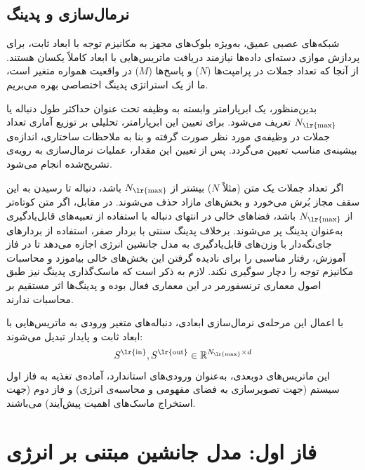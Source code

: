 \subsection{نرمال‌سازی و پدینگ}\label{sec:4-2-3}

شبکه‌های عصبی عمیق، به‌ویژه بلوک‌های مجهز به مکانیزم توجه با ابعاد ثابت، برای پردازش موازی دسته‌ای داده‌ها نیازمند دریافت ماتریس‌هایی با ابعاد کاملاً یکسان هستند. از آنجا که تعداد جملات در پرامپت‌ها ($N$) و پاسخ‌ها ($M$) در واقعیت همواره متغیر است، ما از یک استراتژی پدینگ اختصاصی بهره می‌بریم.

بدین‌منظور، یک ابرپارامتر وابسته به وظیفه تحت عنوان حداکثر طول دنباله یا $N_{\text{\lr{max}}}$ تعریف می‌شود. برای تعیین این ابرپارامتر، تحلیلی بر توزیع آماری تعداد جملات در وظیفه‌ی مورد نظر صورت گرفته و بنا به ملاحظات ساختاری، اندازه‌ی بیشینه‌ی مناسب تعیین می‌گردد. پس از تعیین این مقدار، عملیات نرمال‌سازی به رویه‌ی تشریح‌شده انجام می‌شود.

اگر تعداد جملات یک متن (مثلاً $N$) بیشتر از $N_{\text{\lr{max}}}$ باشد، دنباله تا رسیدن به این سقف مجاز بُرش می‌خورد و بخش‌های مازاد حذف می‌شوند. در مقابل، اگر متن کوتاه‌تر از $N_{\text{\lr{max}}}$ باشد، فضاهای خالی در انتهای دنباله با استفاده از تعبیه‌های قابل‌یادگیری به‌عنوان پدینگ پر می‌شوند. برخلاف پدینگ سنتی با بردار صفر، استفاده از بردارهای جای‌نگه‌دار با وزن‌های قابل‌یادگیری به مدل جانشین انرژی اجازه می‌دهد تا در فاز آموزش، رفتار مناسبی را برای نادیده گرفتن این بخش‌های خالی بیاموزد و محاسبات مکانیزم توجه را دچار سوگیری نکند. لازم به ذکر است که ماسک‌گذاری پدینگ نیز طبق اصول معماری ترنسفورمر در این معماری فعال بوده و پدینگ‌ها اثر مستقیم بر محاسبات ندارند.

با اعمال این مرحله‌ی نرمال‌سازی ابعادی، دنباله‌های متغیر ورودی به ماتریس‌هایی با ابعاد ثابت و پایدار تبدیل می‌شوند:
\begin{equation}\label{eq:chap4_final_tensors}
    S^{\text{\lr{in}}}, S^{\text{\lr{out}}} \in \mathbb{R}^{N_{\text{\lr{max}}} \times d}
\end{equation}
این ماتریس‌های دوبعدی، به‌عنوان ورودی‌های استاندارد، آماده‌ی تغذیه به فاز اول سیستم (جهت تصویرسازی به فضای مفهومی و محاسبه‌ی انرژی) و فاز دوم (جهت استخراج ماسک‌های اهمیت پیش‌آیند) می‌باشند.



\section{فاز اول: مدل جانشین مبتنی بر انرژی}\label{sec:4-3}

